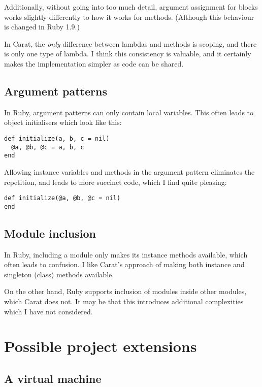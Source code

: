 Additionally, without going into too much detail, argument assignment for blocks works slightly differently to how it works for methods. (Although this behaviour is changed in Ruby 1.9.)

In Carat, the \textit{only} difference between lambdas and methods is scoping, and there is only one type of lambda. I think this consistency is valuable, and it certainly makes the implementation simpler as code can be shared.

\subsection{Argument patterns}

In Ruby, argument patterns can only contain local variables. This often leads to object initialisers which look like this:

\begin{lstlisting}
def initialize(a, b, c = nil)
  @a, @b, @c = a, b, c
end
\end{lstlisting}

Allowing instance variables and methods in the argument pattern eliminates the repetition, and leads to more succinct code, which I find quite pleasing:

\begin{lstlisting}
def initialize(@a, @b, @c = nil)
end
\end{lstlisting}

\subsection{Module inclusion}

In Ruby, including a module only makes its instance methods available, which often leads to confusion. I like Carat's approach of making both instance and singleton (class) methods available.

On the other hand, Ruby supports inclusion of modules inside other modules, which Carat does not. It may be that this introduces additional complexities which I have not considered.

\section{Possible project extensions}

\subsection{A virtual machine}

